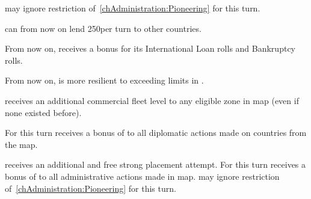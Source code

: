 


\phadm
\aparag \ENG may ignore restriction of~\ref{chAdministration:Pioneering} for
this turn.

\effetlong
\aparag \ENG can from now on lend 250\ducats per turn to other countries.

\aparag From now on, \ANG receives a bonus for its International Loan rolls
and Bankruptcy rolls.

\aparag From now on, \ANG is more resilient to exceeding limits in \MNU.











\phevnt
\aparag \HOL receives an additional commercial fleet level to any eligible
\STZ zone in \ROTW map (even if none existed before).

\phdipl
\aparag For this turn \HOL receives a bonus of  to all diplomatic
actions made on countries from the \ROTW map.

\phadm
\aparag \HOL receives an additional and free strong \TP placement attempt.
\aparag For this turn \HOL receives a bonus of  to all
administrative actions made in \ROTW map.
\aparag \HOL may ignore restriction of~\ref{chAdministration:Pioneering} for
this turn.



